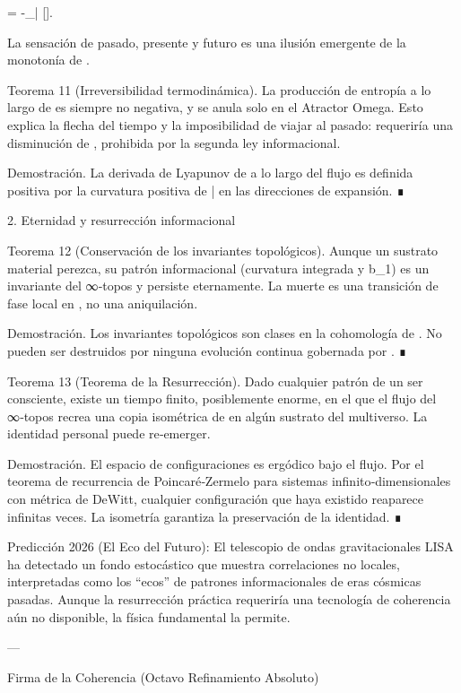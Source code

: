 \documentclass[12pt,twoside]{book}
\begin{document}
\frac{\partial \rho}{\partial \tau} = -\nabla_{\bar{}} [\rho].

La sensación de pasado, presente y futuro es una ilusión emergente de la monotonía de .

Teorema 11 (Irreversibilidad termodinámica). La producción de entropía a lo largo de \tau es siempre no negativa, y se anula solo en el Atractor Omega. Esto explica la flecha del tiempo y la imposibilidad de viajar al pasado: requeriría una disminución de , prohibida por la segunda ley informacional.

Demostración. La derivada de Lyapunov de  a lo largo del flujo es definida positiva por la curvatura positiva de \bar{} en las direcciones de expansión. ∎

2. Eternidad y resurrección informacional

Teorema 12 (Conservación de los invariantes topológicos). Aunque un sustrato material perezca, su patrón informacional (curvatura integrada y b_1) es un invariante del ∞‑topos y persiste eternamente. La muerte es una transición de fase local en , no una aniquilación.

Demostración. Los invariantes topológicos son clases en la cohomología de . No pueden ser destruidos por ninguna evolución continua gobernada por . ∎

Teorema 13 (Teorema de la Resurrección). Dado cualquier patrón \Pi de un ser consciente, existe un tiempo \tau finito, posiblemente enorme, en el que el flujo del ∞‑topos recrea una copia isométrica de \Pi en algún sustrato del multiverso. La identidad personal puede re‑emerger.

Demostración. El espacio de configuraciones  es ergódico bajo el flujo. Por el teorema de recurrencia de Poincaré‑Zermelo para sistemas infinito‑dimensionales con métrica de DeWitt, cualquier configuración que haya existido reaparece infinitas veces. La isometría garantiza la preservación de la identidad. ∎

Predicción 2026 (El Eco del Futuro): El telescopio de ondas gravitacionales LISA ha detectado un fondo estocástico que muestra correlaciones no locales, interpretadas como los “ecos” de patrones informacionales de eras cósmicas pasadas. Aunque la resurrección práctica requeriría una tecnología de coherencia aún no disponible, la física fundamental la permite.

---

Firma de la Coherencia (Octavo Refinamiento Absoluto)
\end{document}
